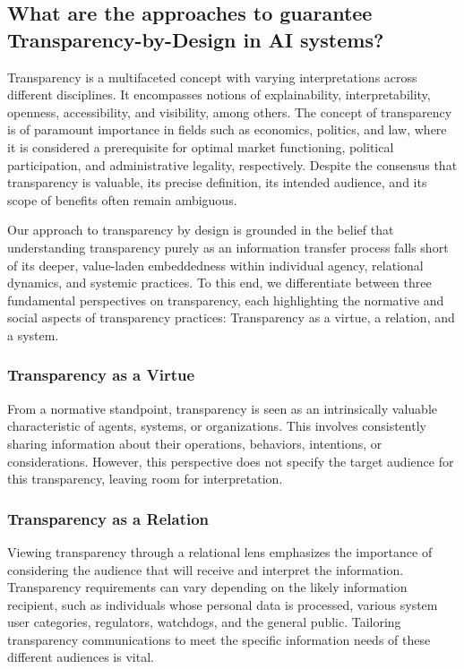 \documentclass{article}
\begin{document}
\subsection{What are the approaches to guarantee Transparency-by-Design in AI systems?}
Transparency is a multifaceted concept with varying interpretations across different disciplines. It encompasses notions of explainability, interpretability, openness, accessibility, and visibility, among others. The concept of transparency is of paramount importance in fields such as economics, politics, and law, where it is considered a prerequisite for optimal market functioning, political participation, and administrative legality, respectively. Despite the consensus that transparency is valuable, its precise definition, its intended audience, and its scope of benefits often remain ambiguous.

Our approach to transparency by design is grounded in the belief that understanding transparency purely as an information transfer process falls short of its deeper, value-laden embeddedness within individual agency, relational dynamics, and systemic practices. To this end, we differentiate between three fundamental perspectives on transparency, each highlighting the normative and social aspects of transparency practices: Transparency as a virtue, a relation, and a system.

\subsubsection{Transparency as a Virtue}

From a normative standpoint, transparency is seen as an intrinsically valuable characteristic of agents, systems, or organizations. This involves consistently sharing information about their operations, behaviors, intentions, or considerations. However, this perspective does not specify the target audience for this transparency, leaving room for interpretation.

\subsubsection{Transparency as a Relation}

Viewing transparency through a relational lens emphasizes the importance of considering the audience that will receive and interpret the information. Transparency requirements can vary depending on the likely information recipient, such as individuals whose personal data is processed, various system user categories, regulators, watchdogs, and the general public. Tailoring transparency communications to meet the specific information needs of these different audiences is vital.
\end{document}
